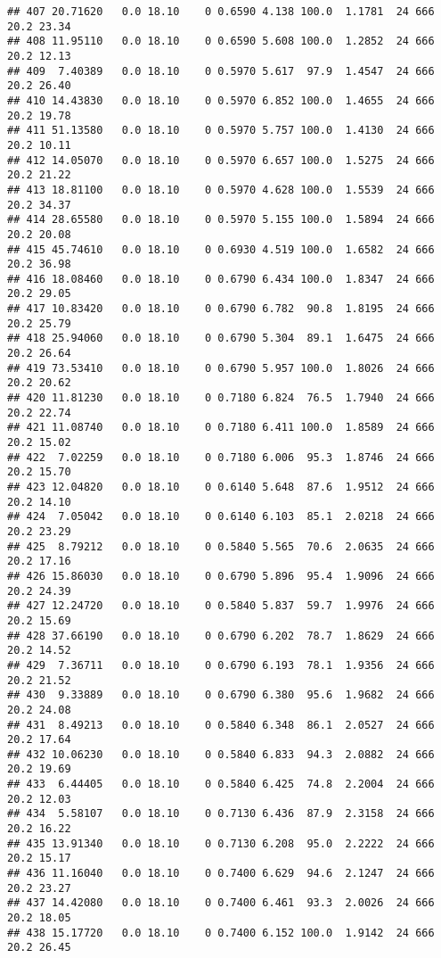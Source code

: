 \documentclass[
]{article}
\begin{document}
\begin{verbatim}
## 407 20.71620   0.0 18.10    0 0.6590 4.138 100.0  1.1781  24 666    20.2 23.34
## 408 11.95110   0.0 18.10    0 0.6590 5.608 100.0  1.2852  24 666    20.2 12.13
## 409  7.40389   0.0 18.10    0 0.5970 5.617  97.9  1.4547  24 666    20.2 26.40
## 410 14.43830   0.0 18.10    0 0.5970 6.852 100.0  1.4655  24 666    20.2 19.78
## 411 51.13580   0.0 18.10    0 0.5970 5.757 100.0  1.4130  24 666    20.2 10.11
## 412 14.05070   0.0 18.10    0 0.5970 6.657 100.0  1.5275  24 666    20.2 21.22
## 413 18.81100   0.0 18.10    0 0.5970 4.628 100.0  1.5539  24 666    20.2 34.37
## 414 28.65580   0.0 18.10    0 0.5970 5.155 100.0  1.5894  24 666    20.2 20.08
## 415 45.74610   0.0 18.10    0 0.6930 4.519 100.0  1.6582  24 666    20.2 36.98
## 416 18.08460   0.0 18.10    0 0.6790 6.434 100.0  1.8347  24 666    20.2 29.05
## 417 10.83420   0.0 18.10    0 0.6790 6.782  90.8  1.8195  24 666    20.2 25.79
## 418 25.94060   0.0 18.10    0 0.6790 5.304  89.1  1.6475  24 666    20.2 26.64
## 419 73.53410   0.0 18.10    0 0.6790 5.957 100.0  1.8026  24 666    20.2 20.62
## 420 11.81230   0.0 18.10    0 0.7180 6.824  76.5  1.7940  24 666    20.2 22.74
## 421 11.08740   0.0 18.10    0 0.7180 6.411 100.0  1.8589  24 666    20.2 15.02
## 422  7.02259   0.0 18.10    0 0.7180 6.006  95.3  1.8746  24 666    20.2 15.70
## 423 12.04820   0.0 18.10    0 0.6140 5.648  87.6  1.9512  24 666    20.2 14.10
## 424  7.05042   0.0 18.10    0 0.6140 6.103  85.1  2.0218  24 666    20.2 23.29
## 425  8.79212   0.0 18.10    0 0.5840 5.565  70.6  2.0635  24 666    20.2 17.16
## 426 15.86030   0.0 18.10    0 0.6790 5.896  95.4  1.9096  24 666    20.2 24.39
## 427 12.24720   0.0 18.10    0 0.5840 5.837  59.7  1.9976  24 666    20.2 15.69
## 428 37.66190   0.0 18.10    0 0.6790 6.202  78.7  1.8629  24 666    20.2 14.52
## 429  7.36711   0.0 18.10    0 0.6790 6.193  78.1  1.9356  24 666    20.2 21.52
## 430  9.33889   0.0 18.10    0 0.6790 6.380  95.6  1.9682  24 666    20.2 24.08
## 431  8.49213   0.0 18.10    0 0.5840 6.348  86.1  2.0527  24 666    20.2 17.64
## 432 10.06230   0.0 18.10    0 0.5840 6.833  94.3  2.0882  24 666    20.2 19.69
## 433  6.44405   0.0 18.10    0 0.5840 6.425  74.8  2.2004  24 666    20.2 12.03
## 434  5.58107   0.0 18.10    0 0.7130 6.436  87.9  2.3158  24 666    20.2 16.22
## 435 13.91340   0.0 18.10    0 0.7130 6.208  95.0  2.2222  24 666    20.2 15.17
## 436 11.16040   0.0 18.10    0 0.7400 6.629  94.6  2.1247  24 666    20.2 23.27
## 437 14.42080   0.0 18.10    0 0.7400 6.461  93.3  2.0026  24 666    20.2 18.05
## 438 15.17720   0.0 18.10    0 0.7400 6.152 100.0  1.9142  24 666    20.2 26.45

\end{verbatim}
\end{document}

